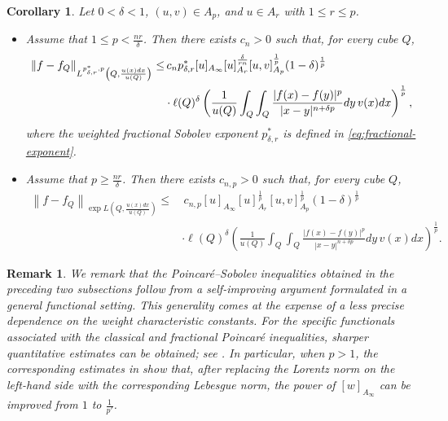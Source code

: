 \documentclass[reqno, 10pt, oneside]{amsart}
\numberwithin{equation}{section}
\newcommand{\strt}[1]{\rule{0pt}{#1}}
\newtheorem{corollary}[theorem]{Corollary}
\newtheorem{remark}[theorem]{Remark}
\numberwithin{theorem}{section}
\newcommand{\1}{{\rm 1\hspace*{-0.4ex}%
\rule{0.1ex}{1.52ex}\hspace*{0.2ex}}}
\begin{document}
\begin{corollary}\label{thm:fractional-PS-pairs}
	Let $0<\delta<1$, $(u,v)\in A_p$, and $u\in A_r$ with $1\le r\le p$.

	\begin{itemize}
		\item Assume that $1\le p < \frac{nr}{\delta}$. Then there exists $c_{n}>0$ such that, for every cube $Q$,
		\begin{align*}
			\left\| f-f_{Q}\right\|_{\strt{2.3ex} L^{p^*_{\delta, r}, p} \left(Q, \frac{u(x)dx}{u(Q)} \right)}
			\le & \, c_n p^*_{\delta, r} [u]_{A_\infty} [u]_{A_r}^{\frac{\delta}{rn}} [u,v]_{A_p}^{\frac{1}{p}}(1-\delta)^\frac{1}{p}  \\
			& \cdot \ell(Q)^\delta \left( \frac{1}{u(Q)}\int_Q \int_Q \frac{|f(x)-f(y)|^p}{|x-y|^{n+\delta p }}dy\, v(x)dx \right)^\frac{1}{p},
		\end{align*}
        where the weighted fractional Sobolev exponent $p^{*}_{\delta, r}$ is defined in \eqref{eq:fractional-exponent}.
		
		\item Assume that $p \ge \frac{nr}{\delta}$. Then there exists $c_{n,p}>0$ such that, for every cube $Q$,
		\begin{align}\label{exp result fractional}
			\left\| f-f_Q\right\|_{\exp L \left(Q, \frac{u(x)dx}{u(Q)} \right)}
			\le & \, c_{n,p} [u]_{A_\infty} [u]_{A_r}^{\frac{1}{p}} [u,v]_{A_p}^{\frac{1}{p}} (1-\delta)^\frac{1}{p} \nonumber  \\
			& \cdot \ell(Q)^\delta \left( \frac{1}{u(Q)}\int_Q \int_Q \frac{|f(x)-f(y)|^p}{|x-y|^{n+\delta p }}dy\, v(x)dx \right)^\frac{1}{p}.
		\end{align}
	\end{itemize}
\end{corollary}

\begin{remark}
We remark that the Poincaré--Sobolev inequalities obtained in the preceding two subsections follow from a self-improving argument formulated in a general functional setting. This generality comes at the expense of a less precise dependence on the weight characteristic constants. For the specific functionals associated with the classical and fractional Poincaré inequalities, sharper quantitative estimates can be obtained; see \cite{ClarosJFA, LoristWagenaar}. In particular, when $p>1$, the corresponding estimates in \cite[Corollaries 4.4 and 5.4]{LoristWagenaar} show that, after replacing the Lorentz norm on the left-hand side with the corresponding Lebesgue norm, the power of $[w]_{A_\infty}$ can be improved from $1$ to $\tfrac{1}{p'}$.
\end{remark}
\end{document}
